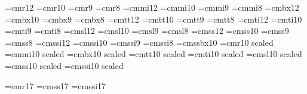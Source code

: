 %
%
\font\twelverm=cmr12  \font\tenrm=cmr10  \font\ninerm=cmr9  \font\eightrm=cmr8
\font\twelvei=cmmi12  \font\teni=cmmi10  \font\ninei=cmmi9  \font\eighti=cmmi8
\font\twelvebf=cmbx12 \font\tenbf=cmbx10 \font\ninebf=cmbx9 \font\eightbf=cmbx8
\font\twelvett=cmtt12 \font\tentt=cmtt10 \font\ninett=cmtt9 \font\eighttt=cmtt8
\font\twelveit=cmti12 \font\tenit=cmti10 \font\nineit=cmti9 \font\eightit=cmti8
\font\twelvesl=cmsl12 \font\tensl=cmsl10 \font\ninesl=cmsl9 \font\eightsl=cmsl8
\font\twelvess=cmss12 \font\tenss=cmss10 \font\niness=cmss9 \font\eightss=cmss8
\font\twelvessi=cmssi12 \font\tenssi=cmssi10 \font\ninessi=cmssi9
\font\eightssi=cmssi8  \font\tenssb=cmssbx10
%
%
\font\elevenrm=cmr10 scaled\magstephalf
\font\eleveni=cmmi10 scaled\magstephalf
\font\elevenbf=cmbx10 scaled\magstephalf
\font\eleventt=cmtt10 scaled\magstephalf
\font\elevenit=cmti10 scaled\magstephalf
\font\elevensl=cmsl10 scaled\magstephalf
\font\elevenss=cmss10 scaled\magstephalf
\font\elevenssi=cmssi10 scaled\magstephalf

\font\seventeenrm=cmr17  \font\seventeenss=cmss17  \font\seventeenssi=cmssi17

\def\seventeenpoint{%
	\def\sl{\seventeenssi}\def\it{\seventeenssi}\def\bf{\seventeenss}%
	\def\rm{\seventeenrm}\def\ss{\seventeenss}\def\ssi{\seventeenssi}%
	\baselineskip=19pt%
	\rm%
}
\def\twelvepoint{%
	\def\sl{\twelvesl}\def\it{\twelveit}\def\bf{\twelvebf}%
	\def\rm{\twelverm\let\sl=\twelvesl}\def\ss{\twelvess\let\sl=\ssi}%
	\def\ssi{\twelvessi}\def\tt{\twelvett}%
	\baselineskip=14pt%
	\rm%
}
\def\elevenpoint{%
	\def\sl{\elevensl}\def\it{\elevenit}\def\bf{\elevenbf}%
	\def\rm{\elevenrm\let\sl=\elevensl}\def\ss{\elevenss\let\sl=\ssi}%
	\def\ssi{\elevenssi}%
	\def\tt{\eleventt}%
	\baselineskip=13pt%
	\rm%
}
\def\tenpoint{%
	\def\sl{\tensl}\def\it{\tenit}\def\bf{\tenbf}%
	\def\ssb{\tenssb}%
	\def\rm{\tenrm\let\sl=\tensl}\def\ss{\tenss\let\sl=\ssi}%
	\def\ssi{\tenssi}%
	\def\tt{\tentt}%
	\baselineskip=12pt%
	\rm%
}
\def\ninepoint{%
	\def\sl{\ninesl}\def\it{\nineit}\def\bf{\ninebf}%
	\def\rm{\ninerm\let\sl=\ninesl}\def\ss{\niness\let\sl=\ssi}%
	\def\ssi{\ninessi}%
	\def\tt{\ninett}%
	\baselineskip=11pt%
	\rm%
}
\def\eightpoint{%
	\def\sl{\eightsl}\def\it{\eightit}\def\bf{\eightbf}%
	\def\rm{\eightrm\let\sl=\eightsl}\def\ss{\eightss\let\sl=\ssi}%
	\def\ssi{\eightssi}%
	\def\tt{\eighttt}%
	\baselineskip=10pt%
	\rm%
}

